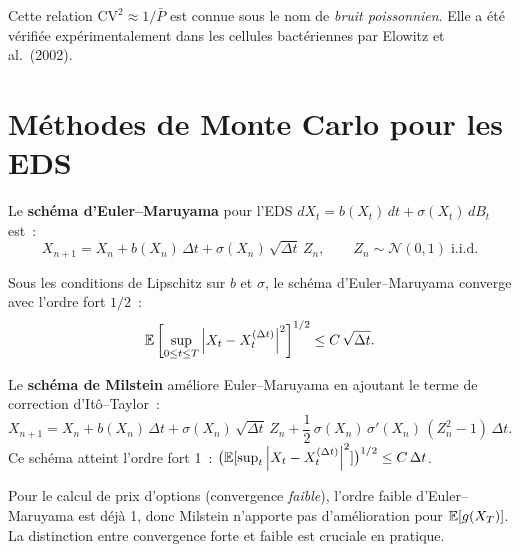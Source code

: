 \begin{remarque}
Cette relation $\text{CV}^2 \approx 1/\bar{P}$ est connue sous le nom
de \emph{bruit poissonnien}. Elle a \'et\'e
v\'erifi\'ee exp\'erimentalement dans les cellules bact\'eriennes
par Elowitz et al.\ (2002).
\end{remarque}

\section{M\'ethodes de Monte Carlo pour les EDS}
\label{sec:mc_eds}

\begin{definition}
Le \textbf{sch\'ema d'Euler--Maruyama} pour l'EDS
$dX_t = b(X_t)\,dt + \sigma(X_t)\,dB_t$ est~:
\[
  X_{n+1} = X_n + b(X_n)\,\Delta t + \sigma(X_n)\,\sqrt{\Delta t}\,Z_n,
  \qquad Z_n \sim \mathcal{N}(0,1)\;\text{i.i.d.}
\]
\end{definition}

\begin{theoreme}
Sous les conditions de Lipschitz sur $b$ et $\sigma$, le sch\'ema
d'Euler--Maruyama converge avec l'ordre fort $1/2$~:
\[
  \mathbb{E}\left[\sup_{0 \leq t \leq T} \left| X_t - X_t^{(\Delta t)} \right|^2\right]^{1/2}
  \leq C\,\sqrt{\Delta t}.
\]
\end{theoreme}

\begin{definition}
Le \textbf{sch\'ema de Milstein} am\'eliore Euler--Maruyama en ajoutant
le terme de correction d'It\^o--Taylor~:
\[
  X_{n+1} = X_n + b(X_n)\,\Delta t + \sigma(X_n)\,\sqrt{\Delta t}\,Z_n
    + \frac{1}{2}\,\sigma(X_n)\,\sigma'(X_n)\,(Z_n^2 - 1)\,\Delta t.
\]
Ce sch\'ema atteint l'ordre fort 1~:
$\bigl(\mathbb{E}[\sup_t \left| X_t - X_t^{(\Delta t)} \right|^2]\bigr)^{1/2} \leq C\,\Delta t$.
\end{definition}

\begin{attention}
Pour le calcul de prix d'options (convergence \emph{faible}), l'ordre
faible d'Euler--Maruyama est d\'ej\`a 1, donc Milstein n'apporte pas
d'am\'elioration pour $\mathbb{E}[g(X_T)]$. La distinction entre convergence
forte et faible est cruciale en pratique.
\end{attention}

